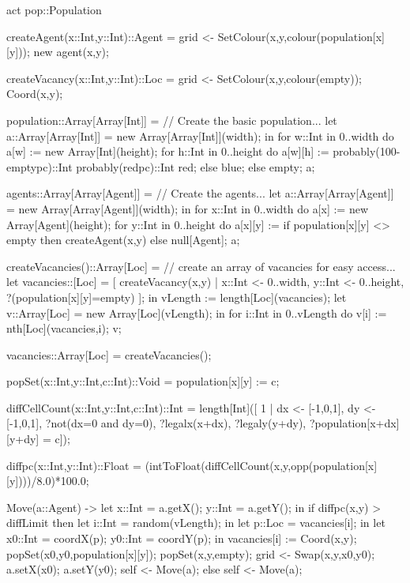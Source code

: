\documentclass[5p,times]{elsarticle}
\begin{document}
\begin{ESL}
act pop::Population {

  createAgent(x::Int,y::Int)::Agent = {
    grid <- SetColour(x,y,colour(population[x][y]));
    new agent(x,y);
  }

  createVacancy(x::Int,y::Int)::Loc = {
    grid <- SetColour(x,y,colour(empty));
    Coord(x,y);
  }

  population::Array[Array[Int]] = 
    // Create the basic population...
    let a::Array[Array[Int]] = new Array[Array[Int]](width); 
    in {
      for w::Int in 0..width do {
        a[w] := new Array[Int](height);
        for h::Int in 0..height do {
          a[w][h] := 
            probably(100-emptypc)::Int { 
              probably(redpc)::Int 
                red; 
              else blue; 
            } else empty;
        }
      }
      a;
    }

  agents::Array[Array[Agent]] =
    // Create the agents...
    let a::Array[Array[Agent]] = 
          new Array[Array[Agent]](width);
    in {
      for x::Int in 0..width do {
        a[x] := new Array[Agent](height);
        for y::Int in 0..height do {
          a[x][y] := if population[x][y] <> empty 
                     then createAgent(x,y) 
                     else null[Agent];
        }
      }
      a;
    }

  createVacancies()::Array[Loc] =
    // create an array of vacancies for easy access...
    let vacancies::[Loc] = [ createVacancy(x,y) | 
                              x::Int <- 0..width, 
                              y::Int <- 0..height, 
                              ?(population[x][y]=empty) ];
    in {
      vLength := length[Loc](vacancies);
      let v::Array[Loc] = new Array[Loc](vLength);
      in {
        for i::Int in 0..vLength do {
          v[i] := nth[Loc](vacancies,i);
        }
        v;
      }
    }
  
  vacancies::Array[Loc] = createVacancies();
  
  popSet(x::Int,y::Int,c::Int)::Void =  population[x][y] := c;
  
  diffCellCount(x::Int,y::Int,c::Int)::Int =  length[Int]([ 1 | 
    dx <- [-1,0,1], 
    dy <- [-1,0,1], 
    ?not(dx=0 and dy=0),
    ?legalx(x+dx), 
    ?legaly(y+dy), 
    ?population[x+dx][y+dy] = c]);
    
  diffpc(x::Int,y::Int)::Float = 
    (intToFloat(diffCellCount(x,y,opp(population[x][y])))/8.0)*100.0;

  Move(a::Agent) -> { 
    let x::Int = a.getX(); y::Int = a.getY(); in
    if diffpc(x,y) > diffLimit 
    then 
      let i::Int = random(vLength); in
      let p::Loc = vacancies[i]; in
      let x0::Int = coordX(p); y0::Int = coordY(p);
      in { 
        vacancies[i] := Coord(x,y);
        popSet(x0,y0,population[x][y]);
        popSet(x,y,empty);
        grid <- Swap(x,y,x0,y0);
        a.setX(x0);
        a.setY(y0);
        self <- Move(a);
      } 
    else self <- Move(a);
  }
}
\end{ESL}
\end{document}
